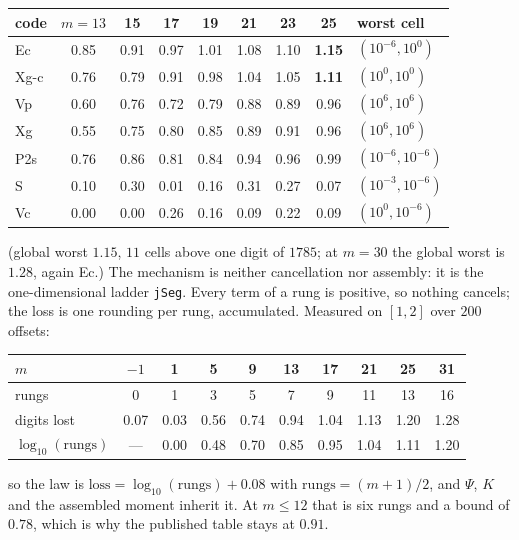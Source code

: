 \documentclass[11pt]{article}
\theoremstyle{remark}
\newcommand{\code}[1]{\texttt{#1}}
\begin{document}
\begin{center}\small
\begin{tabular}{@{}lccccccc l@{}}
\toprule
code & $m{=}13$ & 15 & 17 & 19 & 21 & 23 & 25 & worst cell\\
\midrule
Ec    & 0.85 & 0.91 & 0.97 & 1.01 & 1.08 & 1.10 & \textbf{1.15} & $(10^{-6}, 10^{0})$\\
Xg-c  & 0.76 & 0.79 & 0.91 & 0.98 & 1.04 & 1.05 & \textbf{1.11} & $(10^{0}, 10^{0})$\\
Vp    & 0.60 & 0.76 & 0.72 & 0.79 & 0.88 & 0.89 & 0.96 & $(10^{6}, 10^{6})$\\
Xg    & 0.55 & 0.75 & 0.80 & 0.85 & 0.89 & 0.91 & 0.96 & $(10^{6}, 10^{6})$\\
P2s   & 0.76 & 0.86 & 0.81 & 0.84 & 0.94 & 0.96 & 0.99 & $(10^{-6}, 10^{-6})$\\
S     & 0.10 & 0.30 & 0.01 & 0.16 & 0.31 & 0.27 & 0.07 & $(10^{-3}, 10^{-6})$\\
Vc    & 0.00 & 0.00 & 0.26 & 0.16 & 0.09 & 0.22 & 0.09 & $(10^{0}, 10^{-6})$\\
\bottomrule
\end{tabular}
\end{center}
\noindent
(global worst $1.15$, $11$ cells above one digit of $1785$; at $m = 30$ the global worst is
$1.28$, again Ec.) The mechanism is neither cancellation nor assembly: it is the
one-dimensional ladder \code{jSeg}. Every term of a rung is positive, so nothing cancels;
the loss is one rounding per rung, accumulated. Measured on $[1,2]$ over $200$ offsets:

\begin{center}\small
\begin{tabular}{@{}lccccccccc@{}}
\toprule
$m$ & $-1$ & 1 & 5 & 9 & 13 & 17 & 21 & 25 & 31\\
\midrule
rungs & 0 & 1 & 3 & 5 & 7 & 9 & 11 & 13 & 16\\
digits lost & 0.07 & 0.03 & 0.56 & 0.74 & 0.94 & 1.04 & 1.13 & 1.20 & 1.28\\
$\log_{10}(\text{rungs})$ & --- & 0.00 & 0.48 & 0.70 & 0.85 & 0.95 & 1.04 & 1.11 & 1.20\\
\bottomrule
\end{tabular}
\end{center}
\noindent
so the law is $\text{loss} = \log_{10}(\text{rungs}) + 0.08$ with
$\text{rungs} = (m+1)/2$, and $\Psi$, $K$ and the assembled moment inherit it. At
$m \le 12$ that is six rungs and a bound of $0.78$, which is why the published table stays
at $0.91$.
\end{document}
